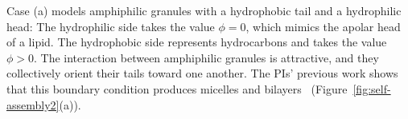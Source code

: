 Case (a) models amphiphilic granules with
a hydrophobic tail and a hydrophilic head: The hydrophilic side takes the value $\phi =0$,
which mimics the apolar head of a lipid.
The hydrophobic side represents hydrocarbons and takes the value $\phi >
0$. The interaction between amphiphilic granules is attractive, and they
collectively orient their tails toward one another.  The PIs' previous
work shows that this   boundary condition produces micelles and
bilayers~\cite{Fu2018_SIAM} (Figure~\ref{fig:self-assembly2}(a)).


